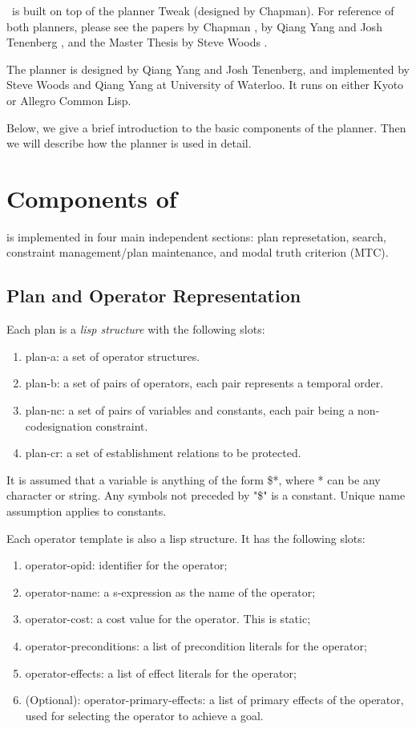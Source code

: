 \abtweak\ is 
built on top of the planner Tweak (designed by Chapman).  For
reference of both planners, please see the papers by Chapman
\cite{tweak}, by Qiang Yang and Josh Tenenberg \cite{abtweak}, and the
Master Thesis by Steve Woods \cite{thesis}.

The planner is designed by Qiang Yang and Josh Tenenberg, and
implemented by Steve Woods and Qiang Yang at University of Waterloo.
It runs on either Kyoto or Allegro Common Lisp.

Below, we give a brief introduction to the basic components of the
planner.  Then we will describe how the planner is used in detail.

\section{Components of \tweak}
\tweak is implemented in four main independent sections: plan
represetation, search, constraint management/plan maintenance, and
modal truth criterion (MTC).

\subsection{Plan and Operator Representation}
Each plan is a {\em lisp structure} with the following slots:
\begin{enumerate}
\item plan-a:  a set of operator structures.
\item 
plan-b: a set of pairs of operators, each pair represents a temporal order.
\item plan-nc: a set of pairs of variables and constants, each pair being a non-codesignation constraint.
\item plan-cr: a set of establishment relations to be protected.
\end{enumerate}

It is assumed that a variable is anything of the form \$*, where * can
be any character or string.  Any symbols not preceded by "\$" is a
constant.  Unique name assumption applies to constants.

Each operator template is also a lisp structure.  It has the following
slots:
\begin{enumerate}
\item operator-opid: identifier for the operator;
\item operator-name: a s-expression as the name of the operator;
\item operator-cost: a cost value for the operator.  This is static;
\item operator-preconditions: a list of precondition literals for the
operator;
\item operator-effects: a list of effect literals for the operator;
\item (Optional): operator-primary-effects: a list of primary effects
of the operator, used for selecting the operator to achieve a goal.
\end{enumerate}

